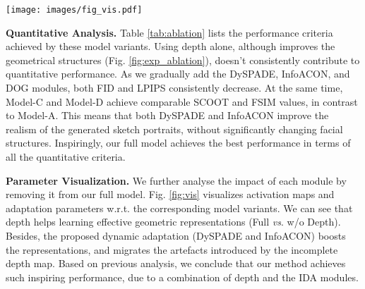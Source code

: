 \documentclass[10pt,twocolumn,letterpaper]{article}
\begin{document}
\begin{figure*}
	\centering
	\texttt{[image: images/fig\_vis.pdf]}
	\caption{Visualization of activations and adaptation parameters, w.r.t. different model variants of HIDA.}
	\label{fig:vis}
\end{figure*}

\textbf{Quantitative Analysis.}
Table \ref{tab:ablation} lists the performance criteria achieved by these model variants. 
Using depth alone, although improves the geometrical structures (Fig. \ref{fig:exp_ablation}), doesn't consistently contribute to quantitative performance. 
As we gradually add the DySPADE, InfoACON, and DOG modules, both FID and LPIPS consistently decrease. At the same time, Model-C and Model-D achieve comparable SCOOT and FSIM values, in contrast to Model-A. This means that both DySPADE and InfoACON improve the realism of the generated sketch portraits, without significantly changing facial structures. Inspiringly, our full model achieves the best performance in terms of all the quantitative criteria. 

\textbf{Parameter Visualization.} 
We further analyse the impact of each module by removing it from our full model. Fig. \ref{fig:vis} visualizes activation maps and adaptation parameters w.r.t. the corresponding model variants. We can see that depth helps learning effective geometric representations (Full \textit{vs}. w/o Depth). Besides, the proposed dynamic adaptation (DySPADE and InfoACON) boosts the representations, and migrates the artefacts introduced by the incomplete depth map. 
Based on previous analysis, we conclude that our method achieves such inspiring performance, due to a combination of depth and the IDA modules.  


\end{document}
